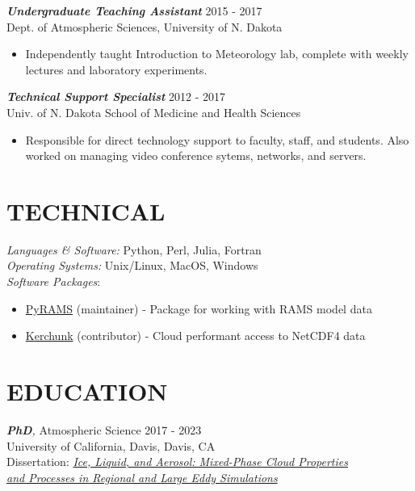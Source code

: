 \documentclass[overlapped]{res}
\begin{document}
\begin{resume}
    {\sl \textbf{Undergraduate Teaching Assistant}} \hfill 2015 - 2017 \\
    Dept. of Atmospheric Sciences, University of N. Dakota \\
    \begin{itemize}\itemsep -2pt
        \item Independently taught Introduction to Meteorology lab, complete with weekly lectures and laboratory experiments.
        
    \end{itemize}

    {\sl \textbf{Technical Support Specialist}} \hfill 2012 - 2017 \\
    Univ. of N. Dakota School of Medicine and Health Sciences \\
    \begin{itemize} \itemsep -2pt
        \item Responsible  for  direct  technology  support  to  faculty,  staff,  and  students.  Also  worked  on managing video conference sytems, networks, and servers.

    \end{itemize}

\section{TECHNICAL} 
    {\sl Languages \& Software:} Python, Perl, Julia, Fortran \\
    {\sl Operating Systems:} Unix/Linux, MacOS, Windows\\
    {\sl Software Packages}:
        \begin{itemize}
            \item \href{https://github.com/lsterzinger/pyrams}{PyRAMS} (maintainer) - Package for working with RAMS model data
            \item \href{https://github.com/fsspec/kerchunk}{Kerchunk} (contributor) - Cloud performant access to NetCDF4 data
        \end{itemize}
                
\section{EDUCATION} 

    {\sl \textbf{PhD},} Atmospheric Science \hfill 2017 - 2023 \\ 
    University of California, Davis, Davis, CA \\ 
    Dissertation: \textit{\href{https://escholarship.org/uc/item/1v54c9tv}{Ice, Liquid, and Aerosol: Mixed-Phase Cloud Properties\\and Processes in Regional and Large Eddy Simulations}}
    

\end{resume}
\end{document}
